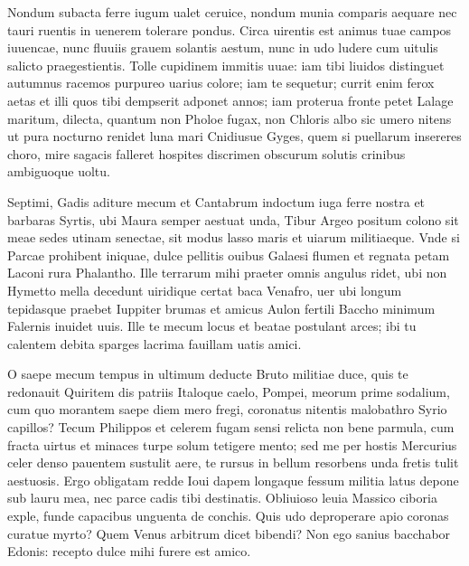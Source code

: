 \documentclass{book}
\newenvironment {carmen} [1] [\relax] 
  {\Titulus \Versus \incipit*\numerus{1}#1}
  {\endVersus}
\newcommand {\Sapphic}   {\Forma \strophae {0 \poena 00 \poena 1}}
\newcommand {\Alcaic}    {\Forma \strophae {0 \poena 01 \poena 2}}
\begin{document}
\begin{carmen}[\Alcaic]


Nondum subacta ferre iugum ualet
 ceruice, nondum munia comparis
      aequare nec tauri ruentis
      in uenerem tolerare pondus. 
Circa uirentis est animus tuae               
 campos iuuencae, nunc fluuiis grauem
      solantis aestum, nunc in udo
      ludere cum uitulis salicto 
praegestientis. Tolle cupidinem
 immitis uuae: iam tibi liuidos               
      distinguet autumnus racemos
      purpureo uarius colore; 
iam te sequetur; currit enim ferox
 aetas et illi quos tibi dempserit
      adponet annos; iam proterua
      fronte petet Lalage maritum,                
dilecta, quantum non Pholoe fugax,
 non Chloris albo sic umero nitens
      ut pura nocturno renidet
      luna mari Cnidiusue Gyges,                
quem si puellarum insereres choro,
 mire sagacis falleret hospites
      discrimen obscurum solutis
      crinibus ambiguoque uoltu. 

\end{carmen}

\begin{carmen}[\Sapphic]


Septimi, Gadis aditure mecum et
 Cantabrum indoctum iuga ferre nostra et
 barbaras Syrtis, ubi Maura semper
      aestuat unda, 
Tibur Argeo positum colono               
 sit meae sedes utinam senectae,
 sit modus lasso maris et uiarum
      militiaeque. 
Vnde si Parcae prohibent iniquae,
 dulce pellitis ouibus Galaesi               
 flumen et regnata petam Laconi
      rura Phalantho. 
Ille terrarum mihi praeter omnis
 angulus ridet, ubi non Hymetto
 mella decedunt uiridique certat               
      baca Venafro, 
uer ubi longum tepidasque praebet
 Iuppiter brumas et amicus Aulon
 fertili Baccho minimum Falernis
      inuidet uuis.                
Ille te mecum locus et beatae
 postulant arces; ibi tu calentem
 debita sparges lacrima fauillam
      uatis amici. 

\end{carmen}

\begin{carmen}[\Alcaic]


O saepe mecum tempus in ultimum
 deducte Bruto militiae duce,
      quis te redonauit Quiritem
      dis patriis Italoque caelo, 
Pompei, meorum prime sodalium,               
 cum quo morantem saepe diem mero
      fregi, coronatus nitentis
      malobathro Syrio capillos? 
Tecum Philippos et celerem fugam
 sensi relicta non bene parmula,               
      cum fracta uirtus et minaces
      turpe solum tetigere mento; 
sed me per hostis Mercurius celer
 denso pauentem sustulit aere,
      te rursus in bellum resorbens               
      unda fretis tulit aestuosis. 
Ergo obligatam redde Ioui dapem
 longaque fessum militia latus
      depone sub lauru mea, nec
      parce cadis tibi destinatis.                
Obliuioso leuia Massico
 ciboria exple, funde capacibus
      unguenta de conchis. Quis udo
      deproperare apio coronas 
curatue myrto? Quem Venus arbitrum               
 dicet bibendi? Non ego sanius
      bacchabor Edonis: recepto
      dulce mihi furere est amico. 

\end{carmen}
\end{document}
